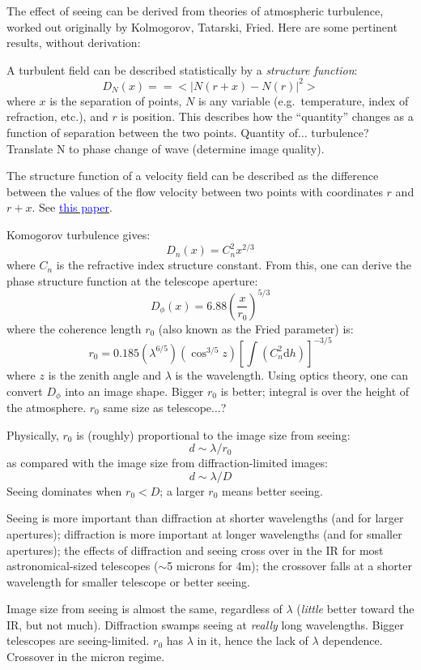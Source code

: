 \documentclass[12pt]{article}
\begin{document}
The effect of seeing can be derived from theories of atmospheric
turbulence, worked out originally by Kolmogorov, Tatarski, Fried.
Here are some pertinent results, without derivation:

A turbulent field can be described statistically by a \emph{structure
function}:
    $$ D_N(x) = = <|N(r+x)-N(r)|^2>  $$
where $x$ is the separation of points, $N$ is any variable (e.g.\
temperature, index of refraction, etc.), and $r$ is position.
This describes how the ``quantity'' changes as a function of separation
between the two points.
\textcolor{myBlue}{Quantity of$\ldots$ turbulence?
Translate N to phase change of wave (determine image quality).}

The structure function of a velocity field can be described as the
difference between the values of the flow velocity between two points
with coordinates $r$ and $r+x$. See
\href{http://jetp.ac.ru/cgi-bin/dn/e_082_03_0580.pdf}
{\textcolor{blue}{this paper}}.

Komogorov turbulence gives:
    $$ D_n(x) = C_n^2x^{2/3} $$
where $C_n$ is the refractive index structure constant.
From this, one can derive the phase structure function at the
telescope aperture:
    $$ D_{\phi}(x) = 6.88\left(\frac{x}{r_0}\right)^{5/3}   $$
where the coherence length $r_0$ (also known as the Fried parameter)
is:
    $$ r_0 = 0.185\left(\lambda^{6/5}\right)
             \left(\cos^{3/5}z\right)
             \left[\int\left(C_n^2\textrm{d}h\right)\right]^{-3/5} $$
where $z$ is the zenith angle and $\lambda$ is the wavelength.
Using optics theory, one can convert $D_{\phi}$ into an image shape.
\textcolor{myBlue}{Bigger $r_0$ is better; integral is over the height
of the atmosphere. $r_0$ same size as telescope$\ldots$?}

Physically, $r_0$ is (roughly) proportional to the image size from
seeing:
    $$ d \sim \lambda/r_0 $$
as compared with the image size from diffraction-limited images:
    $$ d \sim \lambda/D $$
Seeing dominates when $r_0 < D$; a larger $r_0$ means better seeing.

Seeing is more important than diffraction at shorter wavelengths (and
for larger apertures); diffraction is more important at longer
wavelengths (and for smaller apertures); the effects of diffraction
and seeing cross over in the IR for most astronomical-sized telescopes
($\sim$5 microns for 4m); the crossover falls at a shorter wavelength
for smaller telescope or better seeing.

\textcolor{myBlue}{Image size from seeing is almost the same,
regardless of $\lambda$ (\emph{little} better toward the IR, but not
much). Diffraction swamps seeing at \emph{really} long wavelengths.
Bigger telescopes are seeing-limited. $r_0$ has $\lambda$ in it, hence
the lack of $\lambda$ dependence. Crossover in the micron regime.
}
\end{document}
